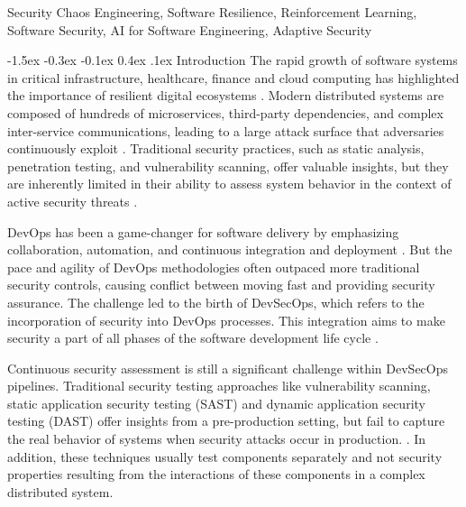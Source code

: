 \documentclass[conference,10pt]{IEEEtran}
\makeatletter
\renewcommand\section{\@startsection{section}{1}{\z@}%
	{-1.5ex \@plus -0.3ex \@minus -0.1ex}%
	{0.4ex \@plus.1ex}%
	{\normalfont\large\bfseries\centering}}
\makeatother
\begin{document}
	\begin{IEEEkeywords}
		Security Chaos Engineering, Software Resilience, Reinforcement Learning, Software Security, AI for Software Engineering, Adaptive Security
	\end{IEEEkeywords}
	
\section{ Introduction}
The rapid growth of software systems in critical infrastructure, healthcare, finance and cloud computing has highlighted the importance of resilient digital ecosystems \cite{basiri2016chaos}. Modern distributed systems are composed of hundreds of microservices, third-party dependencies, and complex inter-service communications, leading to a large attack surface that adversaries continuously exploit \cite{myrbakken2020security}. Traditional security practices, such as static analysis, penetration testing, and vulnerability scanning, offer valuable insights, but they are inherently limited in their ability to assess system behavior in the context of active security threats \cite{shortridge2023security}. 

DevOps has been a game-changer for software delivery by emphasizing collaboration, automation, and continuous integration and deployment \cite{myrbakken2020security}. But the pace and agility of DevOps methodologies often outpaced more traditional security controls, causing conflict between moving fast and providing security assurance. The challenge led to the birth of DevSecOps, which refers to the incorporation of security into DevOps processes. This integration aims to make security a part of all phases of the software development life cycle \cite{myrbakken2020security}. 

Continuous security assessment is still a significant challenge within DevSecOps pipelines. Traditional security testing approaches like vulnerability scanning, static application security testing (SAST) and dynamic application security testing (DAST) offer insights from a pre-production setting, but fail to capture the real behavior of systems when security attacks occur in production. \cite{myrbakken2021security}. In addition, these techniques usually test components separately and not security properties resulting from the interactions of these components in a complex distributed system. 
\end{document}
